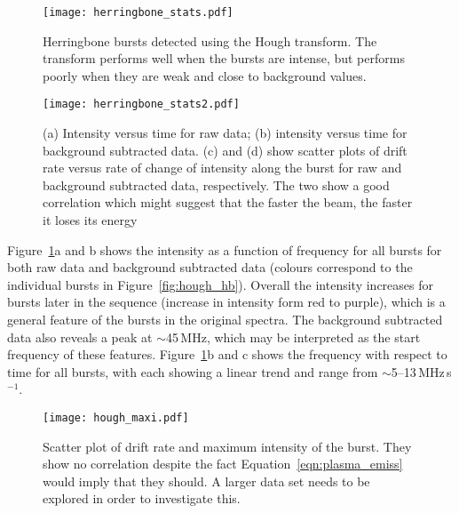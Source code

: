 %
%
\begin{figure}[t!]
\begin{center}
\texttt{[image: herringbone\_stats.pdf]}
\caption[Hough transform herringbones]{Herringbone bursts detected using the Hough transform. The transform performs well when the bursts are intense, but performs poorly when they are weak and close to background values.}
\label{fig:bibf}
\end{center}
\end{figure}


%
%
\begin{figure}[t!]
\begin{center}
\texttt{[image: herringbone\_stats2.pdf]}
\caption[Hough transform herringbones]{(a) Intensity versus time for raw data; (b) intensity versus time for background subtracted data. (c) and (d) show scatter plots of drift rate versus rate of change of intensity along the burst for raw and background subtracted data, respectively.  The two show a good correlation which might suggest that the faster the beam, the faster it loses its energy}
\label{fig:bibt}
\end{center}
\end{figure}
Figure~\ref{fig:bibf}a and b shows the intensity as a function of frequency for all bursts for both raw data and background subtracted data (colours correspond to the individual bursts in Figure~\ref{fig:hough_hb}). Overall the intensity increases for bursts later in the sequence (increase in intensity form red to purple), which is a general feature of the bursts in the original spectra. The background subtracted data also reveals a peak at $\sim$45\,MHz, which may be interpreted as the start frequency of these features.
Figure~\ref{fig:bibf}b and c shows the frequency with respect to time for all bursts, with each showing a linear trend and range from $\sim$5--13\,MHz\,s$^{-1}$.
\begin{figure}[t!]
\begin{center}
\texttt{[image: hough\_maxi.pdf]}
\caption[Hough transform herringbones]{Scatter plot of drift rate and maximum intensity of the burst. They show no correlation despite the fact Equation~\ref{eqn:plasma_emiss} would imply that they should. A larger data set needs to be explored in order to investigate this.}
\label{fig:maxi}
\end{center}
\end{figure}
